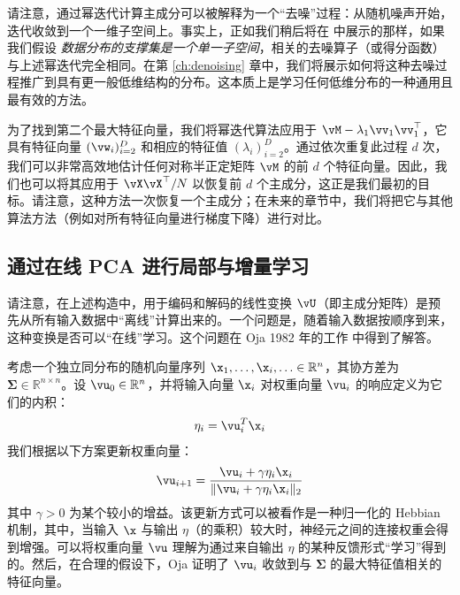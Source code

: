 \documentclass[../../book-main_zh.tex]{subfiles}
\begin{document}
\begin{remark}[作为去噪过程的幂迭代]
    请注意，通过幂迭代计算主成分可以被解释为一个“去噪”过程：从随机噪声开始，迭代收敛到一个一维子空间上。事实上，正如我们稍后将在
     中展示的那样，如果我们假设{\em
    数据分布的支撑集是一个单一子空间}，相关的去噪算子（或得分函数）与上述幂迭代完全相同。在第 \ref{ch:denoising}
    章中，我们将展示如何将这种去噪过程推广到具有更一般低维结构的分布。这本质上是学习任何低维分布的一种通用且最有效的方法。
\end{remark}

为了找到第二个最大特征向量，我们将幂迭代算法应用于 \(\vM -
\lambda_{1}\vv_{1}\vv_{1}^{\top}\)，它具有特征向量 \((\vw_{i})_{i = 2}^{D}\)
和相应的特征值 \((\lambda_{i})_{i = 2}^{D}\)。通过依次重复此过程 \(d\)
次，我们可以非常高效地估计任何对称半正定矩阵 \(\vM\) 的前 \(d\) 个特征向量。因此，我们也可以将其应用于
\(\vX\vX^{\top}/N\) 以恢复前 \(d\)
个主成分，这正是我们最初的目标。请注意，这种方法一次恢复一个主成分；在未来的章节中，我们将把它与其他算法方法（例如对所有特征向量进行梯度下降）进行对比。

%

\subsection{通过在线 PCA 进行局部与增量学习}
请注意，在上述构造中，用于编码和解码的线性变换
$\vU$（即主成分矩阵）是预先从所有输入数据中“离线”计算出来的。一个问题是，随着输入数据按顺序到来，这种变换是否可以“在线”学习。这个问题在
Oja 1982 年的工作 \cite{Oja1982SimplifiedNM} 中得到了解答。
\begin{example} 考虑一个独立同分布的随机向量序列 $\x_1, \ldots, \x_i, \ldots \in
    \mathbb{R}^n$，其协方差为 $\boldsymbol{\Sigma} \in
    \mathbb{R}^{n\times n}$。设 $\vu_0 \in \mathbb{R}^n$，并将输入向量 $\x_i$
    对权重向量 $\vu_i$ 的响应定义为它们的内积：
    \begin{equation}
        \eta_i = \vu_i^T \x_i
    \end{equation}
    我们根据以下方案更新权重向量：
    \begin{equation}
        \vu_{i+1} = \frac{\vu_i + \gamma \eta_i \x_i}{\|\vu_i + \gamma
        \eta_i \x_i\|_2}
        \label{eqn:Hebbian}
    \end{equation}
    其中 $\gamma >0$ 为某个较小的增益。该更新方式可以被看作是一种归一化的 Hebbian 机制，其中，当输入 $\x$ 与输出 $\eta$（的乘积）较大时，神经元之间的连接权重会得到增强。可以将权重向量 $\vu$ 理解为通过来自输出 $\eta$ 的某种反馈形式“学习”得到的。然后，在合理的假设下，Oja \cite{Oja1982SimplifiedNM}
    证明了 $\vu_i$ 收敛到与 $\boldsymbol{\Sigma}$ 的最大特征值相关的特征向量。
\end{example}
\end{document}
